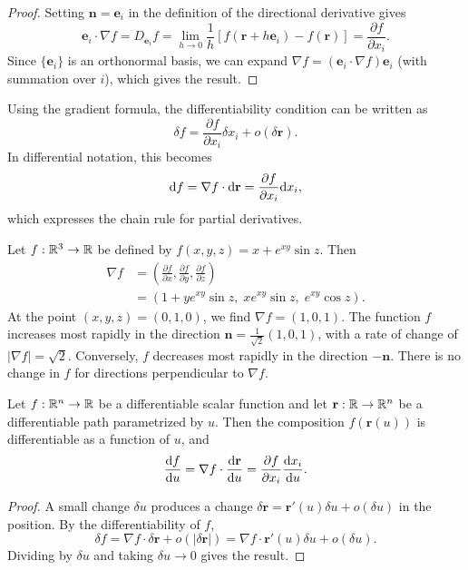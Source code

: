 \documentclass[a4paper]{article}
\begin{document}
\begin{proof}
  Setting $\mathbf{n} = \mathbf{e}_i$ in the definition of the directional derivative gives
  \[
    \mathbf{e}_i \cdot \nabla f = D_{\mathbf{e}_i} f = \lim_{h\to 0} \frac{1}{h}[f(\mathbf{r} + h\mathbf{e}_i) - f(\mathbf{r})] = \frac{\partial f}{\partial x_i}.
  \]
  Since $\{\mathbf{e}_i\}$ is an orthonormal basis, we can expand $\nabla f = (\mathbf{e}_i \cdot \nabla f)\mathbf{e}_i$ (with summation over $i$), which gives the result.
\end{proof}

\begin{rmk}
  Using the gradient formula, the differentiability condition can be written as
  \[
    \delta f = \frac{\partial f}{\partial x_i}\delta x_i + o(\delta \mathbf{r}).
  \]
  In differential notation, this becomes
  \[
    \mathrm{d} f = \nabla f\cdot \mathrm{d} \mathbf{r} = \frac{\partial f}{\partial x_i}\mathrm{d} x_i,
  \]
  which expresses the chain rule for partial derivatives.
\end{rmk}

\begin{eg}
  Let $f: \mathbb{R}^3 \to \mathbb{R}$ be defined by $f(x, y, z) = x + e^{xy}\sin z$. Then
  \begin{align*}
    \nabla f &= \left(\frac{\partial f}{\partial x}, \frac{\partial f}{\partial y}, \frac{\partial f}{\partial z}\right)\\
    &= (1 + ye^{xy}\sin z,\; xe^{xy}\sin z,\; e^{xy}\cos z).
  \end{align*}
  At the point $(x, y, z) = (0, 1, 0)$, we find $\nabla f = (1, 0, 1)$. The function $f$ increases most rapidly in the direction $\mathbf{n} = \frac{1}{\sqrt{2}}(1, 0, 1)$, with a rate of change of $|\nabla f| = \sqrt{2}$. Conversely, $f$ decreases most rapidly in the direction $-\mathbf{n}$. There is no change in $f$ for directions perpendicular to $\nabla f$.
\end{eg}

\begin{thm}
  Let $f: \mathbb{R}^n \to \mathbb{R}$ be a differentiable scalar function and let $\mathbf{r}: \mathbb{R} \to \mathbb{R}^n$ be a differentiable path parametrized by $u$. Then the composition $f(\mathbf{r}(u))$ is differentiable as a function of $u$, and
  \[
    \frac{\mathrm{d} f}{\mathrm{d} u} = \nabla f\cdot \frac{\mathrm{d} \mathbf{r}}{\mathrm{d} u} = \frac{\partial f}{\partial x_i} \frac{\mathrm{d} x_i}{\mathrm{d} u}.
  \]
\end{thm}

\begin{proof}
  A small change $\delta u$ produces a change $\delta \mathbf{r} = \mathbf{r}'(u) \delta u + o(\delta u)$ in the position. By the differentiability of $f$,
  \[
    \delta f = \nabla f\cdot \delta \mathbf{r} + o(|\delta \mathbf{r}|) = \nabla f\cdot \mathbf{r}'(u)\delta u + o(\delta u).
  \]
  Dividing by $\delta u$ and taking $\delta u \to 0$ gives the result.
\end{proof}
\end{document}
